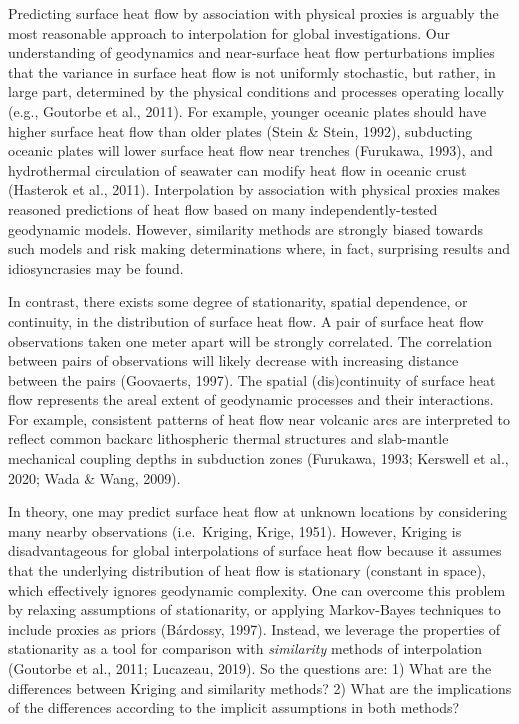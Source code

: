 \documentclass[draft,linenumbers]{agujournal2018}
\begin{document}
Predicting surface heat flow by association with physical proxies is
arguably the most reasonable approach to interpolation for global
investigations. Our understanding of geodynamics and near-surface heat
flow perturbations implies that the variance in surface heat flow is not
uniformly stochastic, but rather, in large part, determined by the
physical conditions and processes operating locally (e.g., Goutorbe et
al., 2011). For example, younger oceanic plates should have higher
surface heat flow than older plates (Stein \& Stein, 1992), subducting
oceanic plates will lower surface heat flow near trenches (Furukawa,
1993), and hydrothermal circulation of seawater can modify heat flow in
oceanic crust (Hasterok et al., 2011). Interpolation by association with
physical proxies makes reasoned predictions of heat flow based on many
independently-tested geodynamic models. However, similarity methods are
strongly biased towards such models and risk making determinations
where, in fact, surprising results and idiosyncrasies may be found.

In contrast, there exists some degree of stationarity, spatial
dependence, or continuity, in the distribution of surface heat flow. A
pair of surface heat flow observations taken one meter apart will be
strongly correlated. The correlation between pairs of observations will
likely decrease with increasing distance between the pairs (Goovaerts,
1997). The spatial (dis)continuity of surface heat flow represents the
areal extent of geodynamic processes and their interactions. For
example, consistent patterns of heat flow near volcanic arcs are
interpreted to reflect common backarc lithospheric thermal structures
and slab-mantle mechanical coupling depths in subduction zones
(Furukawa, 1993; Kerswell et al., 2020; Wada \& Wang, 2009).

In theory, one may predict surface heat flow at unknown locations by
considering many nearby observations (i.e.~Kriging, Krige, 1951).
However, Kriging is disadvantageous for global interpolations of surface
heat flow because it assumes that the underlying distribution of heat
flow is stationary (constant in space), which effectively ignores
geodynamic complexity. One can overcome this problem by relaxing
assumptions of stationarity, or applying Markov-Bayes techniques to
include proxies as priors (Bárdossy, 1997). Instead, we leverage the
properties of stationarity as a tool for comparison with
\emph{similarity} methods of interpolation (Goutorbe et al., 2011;
Lucazeau, 2019). So the questions are: 1) What are the differences
between Kriging and similarity methods? 2) What are the implications of
the differences according to the implicit assumptions in both methods?
\end{document}
